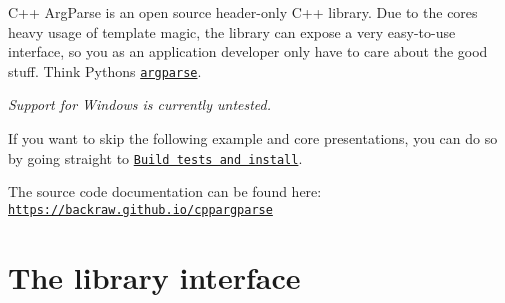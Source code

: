 C++ Arg\+Parse is an open source header-\/only C++ library. Due to the core\textquotesingle{}s heavy usage of template magic, the library can expose a very easy-\/to-\/use interface, so you as an application developer only have to care about the good stuff. Think Python\textquotesingle{}s \href{https://docs.python.org/3/library/argparse.html}{\tt argparse}.

\href{https://travis-ci.org/backraw/cppargparse}{\tt }

{\itshape Support for Windows is currently untested.}

If you want to skip the following example and core presentations, you can do so by going straight to \href{#Build-tests-and-install}{\tt Build tests and install}.

The source code documentation can be found here\+: \href{https://backraw.github.io/cppargparse}{\tt https\+://backraw.\+github.\+io/cppargparse}

\section*{The library interface}

